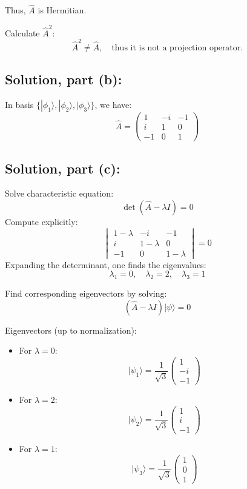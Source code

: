 \documentclass[12pt]{article}
\begin{document}
        Thus, \(\hat{A}\) is Hermitian.
        
        Calculate \(\hat{A}^2\):
        \[
        \hat{A}^2\neq\hat{A}, \quad\text{thus it is not a projection operator.}
        \]

    \subsection*{Solution, part (b):}
        In basis \(\{|\phi_1\rangle, |\phi_2\rangle, |\phi_3\rangle\}\), we have:
        \[
        \hat{A}=\begin{pmatrix}
        1 & -i & -1\\[6pt]
        i & 1 & 0\\[6pt]
        -1 & 0 & 1
        \end{pmatrix}
        \]

    \subsection*{Solution, part (c):}
        Solve characteristic equation:
        \[
        \det(\hat{A}-\lambda I)=0
        \]
        Compute explicitly:
        \[
        \begin{vmatrix}
        1-\lambda & -i & -1\\[6pt]
        i & 1-\lambda & 0\\[6pt]
        -1 & 0 & 1-\lambda
        \end{vmatrix}=0
        \]
        Expanding the determinant, one finds the eigenvalues:
        \[ \lambda_1=0,\quad\lambda_2=2,\quad\lambda_3=1 \]
        
        Find corresponding eigenvectors by solving:
        \[(\hat{A}-\lambda I)|\psi\rangle=0\]
        
        Eigenvectors (up to normalization):
        \begin{itemize}
        \item For \(\lambda=0\):
        \[|\psi_1\rangle=\frac{1}{\sqrt{3}}\begin{pmatrix}1\\-i\\-1\end{pmatrix}\]
        
        \item For \(\lambda=2\):
        \[|\psi_2\rangle=\frac{1}{\sqrt{3}}\begin{pmatrix}1\\i\\-1\end{pmatrix}\]
        
        \item For \(\lambda=1\):
        \[|\psi_3\rangle=\frac{1}{\sqrt{3}}\begin{pmatrix}1\\0\\1\end{pmatrix}\]
        \end{itemize}
        
\end{document}
